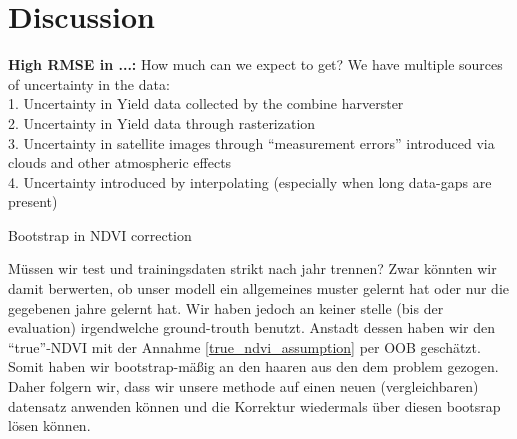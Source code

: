 \chapter{Discussion}


\textbf{High RMSE in ...:} How much can we expect to get? We have multiple sources of uncertainty in the data:
\\1. Uncertainty in Yield data collected by the combine harverster
\\2. Uncertainty in Yield data through rasterization
\\3. Uncertainty in satellite images through ``measurement errors'' introduced via clouds and other atmospheric effects 
\\4. Uncertainty introduced by interpolating (especially when long data-gaps are present)


Bootstrap in NDVI correction

Müssen wir test und trainingsdaten strikt nach jahr trennen?
Zwar könnten wir damit berwerten, ob unser modell ein allgemeines muster gelernt hat oder nur die gegebenen jahre gelernt hat. Wir haben jedoch an keiner stelle (bis der evaluation) irgendwelche ground-trouth benutzt. Anstadt dessen haben wir den ``true''-NDVI mit der Annahme \ref{true_ndvi_assumption} per OOB geschätzt. Somit haben wir bootstrap-mäßig an den haaren aus den dem problem gezogen. Daher folgern wir, dass wir unsere methode auf einen neuen (vergleichbaren) datensatz anwenden können und die Korrektur wiedermals über diesen bootsrap lösen können.


